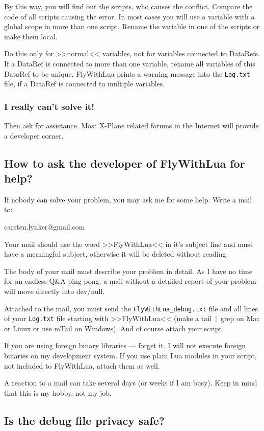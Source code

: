\documentclass[11pt,parskip=half,a4paper]{scrartcl}
\begin{document}
By this way, you will find out the scripts, who causes the conflict. Compare the code of all scripts causing the error. In most cases you will use a variable with a global scope in more than one script. Rename the variable in one of the scripts or make them local.

Do this only for >>normal<< variables, not for variables connected to DataRefs. If a DataRef is connected to more than one variable, rename all variables of this DataRef to be unique. FlyWithLua prints a warning message into the \verb|Log.txt| file, if a DataRef is connected to multiple variables.

\subsubsection{I really can't solve it!}

Then ask for assistance. Most X-Plane related forums in the Internet will provide a developer corner.

\subsection{How to ask the developer of FlyWithLua for help?}

If nobody can solve your problem, you may ask me for some help. Write a mail to:

carsten.lynker@gmail.com

Your mail should use the word >>FlyWithLua<< in it's subject line and must have a meaningful subject, otherwise it will be deleted without reading.

The body of your mail must describe your problem in detail. As I have no time for an endless Q\&A ping-pong, a mail without a detailed report of your problem will move directly into dev/null.

Attached to the mail, you must send the \verb|FlyWithLua_debug.txt| file and all lines of your \verb|Log.txt| file starting with >>FlyWithLua<< (make a tail~|~grep on Mac or Linux or use mTail on Windows). And of course attach your script.

If you are using foreign binary libraries --- forget it. I will not execute foreign binaries on my development system. If you use plain Lua modules in your script, not included to FlyWithLua, attach them as well.

A reaction to a mail can take several days (or weeks if I am busy). Keep in mind that this is my hobby, not my job.

\subsection{Is the debug file privacy safe?}
\end{document}
